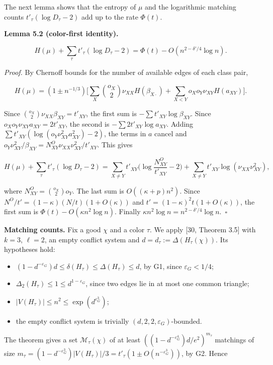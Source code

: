 \documentclass[english,11pt,a4paper]{article}
\providecommand{\tightlist}{\setlength{\itemsep}{0pt}\setlength{\parskip}{0pt}}
\begin{document}
The next lemma shows that the entropy of \(\mu\) and the logarithmic matching counts \(t'_\tau(\log D_\tau-2)\) add up to the rate \(\Phi(t)\).

\textbf{Lemma 5.2 (color-first identity).}

\nopagebreak[4]
\[H(\mu)+\sum_\tau t'_\tau(\log D_\tau-2)=\Phi(t)-O(n^{2-\delta'/4}\log n).\]

\emph{Proof.} By Chernoff bounds for the number of available edges of each class pair,

\nopagebreak[4]
\[H(\mu)=(1\pm n^{-1/3})\Big[\sum_X\binom{o_X}{2}\nu_{XX}H(\beta_{X\cdot})+\sum_{X<Y}o_Xo_Y\nu_{XY}H(a_{XY})\Big].\]

Since \(\binom{o_X}{2}\nu_{XX}\beta_{XY}=t'_{XY}\), the first sum is \(-\sum t'_{XY}\log\beta_{XY}\). Since \(o_Xo_Y\nu_{XY}a_{XY}=2t'_{XY}\), the second is \(-\sum2t'_{XY}\log a_{XY}\). Adding \(\sum t'_{XY}(\log(o_Y\nu_{XY}^2a_{XY}^2)-2)\), the terms in \(a\) cancel and \(o_Y\nu_{XY}^2/\beta_{XY}=N^O_{XY}\nu_{XX}\nu_{XY}^2/t'_{XY}\). This gives

\nopagebreak[4]
\[H(\mu)+\sum_\tau t'_\tau(\log D_\tau-2)=\sum_{X\ne Y}t'_{XY}\Big(\log\frac{N^O_{XY}}{t'_{XY}}-2\Big)+\sum_{X\ne Y}t'_{XY}\log(\nu_{XX}\nu_{XY}^2),\]

where \(N^O_{XY}=\binom{o_X}{2}o_Y\). The last sum is \(O((\kappa+p)n^2)\). Since \(N^O/t'=(1-\kappa)(N/t)(1+O(\kappa))\) and \(t'=(1-\kappa)^2t(1+O(\kappa))\), the first sum is \(\Phi(t)-O(\kappa n^2\log n)\). Finally \(\kappa n^2\log n=n^{2-\delta'/4}\log n\).~\(\square\)

\textbf{Matching counts.} Fix a good \(\chi\) and a color \(\tau\). We apply {[}30, Theorem 3.5{]} with \(k=3\), \(\ell=2\), an empty conflict system and \(d=d_\tau:=\Delta(H_\tau(\chi))\). Its hypotheses hold:

\begin{itemize}
\tightlist
\item
  \((1-d^{-\varepsilon_G})d\le\delta(H_\tau)\le\Delta(H_\tau)\le d\), by G1, since \(\varepsilon_G<1/4\);
\item
  \(\Delta_2(H_\tau)\le1\le d^{1-\varepsilon_G}\), since two edges lie in at most one common triangle;
\item
  \(|V(H_\tau)|\le n^2\le\exp(d^{\varepsilon_G^3})\);
\item
  the empty conflict system is trivially \((d,2,2,\varepsilon_G)\)-bounded.
\end{itemize}

The theorem gives a set \(\mathcal M_\tau(\chi)\) of at least \(((1-d^{-\varepsilon_G^4})d/e^2)^{m_\tau}\) matchings of size \(m_\tau=(1-d^{-\varepsilon_G^3})|V(H_\tau)|/3=t'_\tau(1\pm O(n^{-\varepsilon_G^3}))\), by G2. Hence
\end{document}
